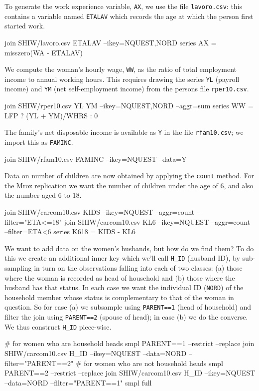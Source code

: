 To generate the work experience variable, \texttt{AX}, we use the file
\texttt{lavoro.csv}: this contains a variable named \texttt{ETALAV}
which records the age at which the person first started work.
%
\begin{code}
join SHIW/lavoro.csv ETALAV --ikey=NQUEST,NORD
series AX = misszero(WA - ETALAV)
\end{code}
%
We compute the woman's hourly wage, \texttt{WW}, as the ratio of total
employment income to annual working hours.  This requires drawing the
series \texttt{YL} (payroll income) and \texttt{YM} (net
self-employment income) from the persons file \texttt{rper10.csv}.
%
\begin{code}
join SHIW/rper10.csv YL YM --ikey=NQUEST,NORD --aggr=sum
series WW = LFP ? (YL + YM)/WHRS : 0
\end{code}
%
The family's net disposable income is available as \texttt{Y} in the file
\texttt{rfam10.csv}; we import this as \texttt{FAMINC}.
%
\begin{code}
join SHIW/rfam10.csv FAMINC --ikey=NQUEST --data=Y
\end{code}
%
Data on number of children are now obtained by applying the
\texttt{count} method. For the Mroz replication we want the number of
children under the age of 6, and also the number aged 6 to 18.
%
\begin{code}
join SHIW/carcom10.csv KIDS --ikey=NQUEST --aggr=count --filter="ETA<=18"
join SHIW/carcom10.csv KL6 --ikey=NQUEST --aggr=count --filter=ETA<6
series K618 = KIDS - KL6
\end{code}
%
We want to add data on the women's husbands, but how do we find them?
To do this we create an additional inner key which we'll call
\verb|H_ID| (husband ID), by sub-sampling in turn on the observations
falling into each of two classes: (a) those where the woman is
recorded as head of household and (b) those where the husband has that
status. In each case we want the individual ID (\texttt{NORD}) of the
household member whose status is complementary to that of the woman in
question. So for case (a) we subsample using \texttt{PARENT==1} (head
of household) and filter the join using \texttt{PARENT==2} (spouse of
head); in case (b) we do the converse. We thus construct \verb|H_ID|
piece-wise.
%
\begin{code}
# for women who are household heads
smpl PARENT==1 --restrict --replace
join SHIW/carcom10.csv H_ID --ikey=NQUEST --data=NORD --filter="PARENT==2"
# for women who are not household heads
smpl PARENT==2 --restrict --replace
join SHIW/carcom10.csv H_ID --ikey=NQUEST --data=NORD --filter="PARENT==1"
smpl full
\end{code}
